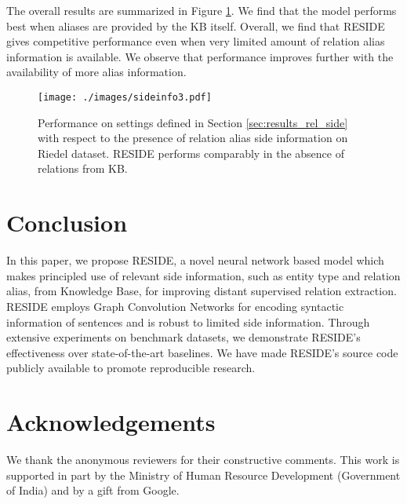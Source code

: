 \documentclass[11pt,a4paper]{article}
\newcommand{\reffig}[1]{Figure \ref{#1}}
\newcommand{\refsec}[1]{Section \ref{#1}}
\newcommand{\method}{RESIDE}
\begin{document}
The overall results are summarized in \reffig{fig:diff_aliases}. We find that the model performs best when aliases are provided by the KB itself. Overall, we find that \method{} gives competitive performance even when very limited amount of relation alias information is available. We observe that performance improves further with the availability of more alias information.


\begin{figure}[t]
	\centering
	\texttt{[image: ./images/sideinfo3.pdf]}
	\caption{\label{fig:diff_aliases} Performance on settings defined in \refsec{sec:results_rel_side} with respect to the presence of relation alias side information on Riedel dataset. \method{} performs comparably in the absence of relations from KB.}
\end{figure}

%
 \section{Conclusion}
\label{sec:conclusion}

In this paper, we propose \method{}, a novel neural network based model which makes principled use of relevant side information, such as entity type and relation alias, from Knowledge Base, for improving distant supervised relation extraction. \method{} employs Graph Convolution Networks for encoding syntactic information of sentences and is robust to limited side information. Through extensive experiments on benchmark datasets, we demonstrate \method{}'s effectiveness over state-of-the-art baselines. We have made \method{}'s source code publicly available to promote reproducible research.
 

\section*{Acknowledgements}
We thank the anonymous reviewers for their constructive comments. This work is supported in part by the Ministry of Human Resource Development (Government of India) and by a gift from Google.



\end{document}
